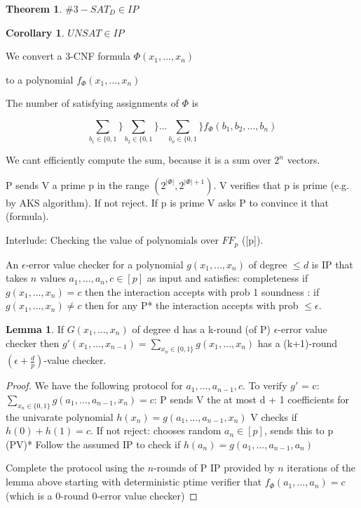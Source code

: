 \documentclass[a4paper,12pt]{article}
\theoremstyle{definition}
\newtheorem{lemma}[counter]{Lemma}
\newtheorem{theorem}[counter]{Theorem}
\newtheorem{corollary}[counter]{Corollary}
\theoremstyle{remark}
\begin{document}
\begin{theorem}
    $\#3-SAT_D \in IP$
\end{theorem}

\begin{corollary}
    $UNSAT \in IP$
\end{corollary}

We convert a 3-CNF formula $\Phi (x_1, \dots, x_n)$


to a polynomial $f_{\Phi} (x_1, \dots, x_n)$

The number of satisfying assignments of $\Phi$ is

\begin{equation*}
    \sum_{b_1 \in \{0, 1}\} \sum_{b_2 \in \{0, 1}\} \dots \sum_{b_n \in \{0, 1}\} f_{\Phi} (b_1, b_2, \dots, b_n)
\end{equation*}

We cant efficiently compute the sum, because it is a sum over $2^n$ vectors.

P sends V a prime p in the range $(2^{|\Phi|}, 2^{|\Phi|+1})$.
V verifies that p is prime (e.g. by AKS algorithm). If not reject.
If p is prime V asks P to convince it that (formula).

Interlude: Checking the value of polynomials over $FF_p$ ([p]).

An $\epsilon$-error value checker for a polynomial $g(x_1, \dots, x_n)$ of degree $\leq d$ is IP that takes $n$ values $a_1, \dots, a_n, c \in [p]$
as input and satisfies:
completeness if $g(x_1, \dots, x_n) = c$ then the interaction accepts with prob 1
soundness : if $g(x_1, \dots, x_n) \neq c$ then for any P* the interaction accepts with prob $\leq \epsilon$.

\begin{lemma}
    If $G(x_1, \dots, x_n)$ of degree d has a k-round (of P) $\epsilon$-error value checker then
    $g'(x_1, \dots, x_{n-1}) = \sum_{x_n \in \{0, 1\}} g(x_1, \dots, x_n)$ has a (k+1)-round
    $(\epsilon + \frac{d}{p})$-value checker.
\end{lemma}

\begin{proof}
    We have the following protocol for $a_1, \dots, a_{n-1}, c$. To verify $g'$ = c: $\sum_{x_n \in \{0, 1\}} g(a_1, \dots, a_{n-1}, x_n) = c$:
    P sends V the at most d + 1 coefficients for the univarate polynomial $h(x_n) = g(a_1, \dots, a_{n-1}, x_n)$
    V checks if $h(0) + h(1) = c$. If not reject:
    chooses random $a_n \in [p]$, sends this to p
    (PV)* Follow the assumed IP to check if $h(a_n) = g(a_1, \dots, a_{n-1}, a_n)$

    Complete the protocol using the $n$-rounds of P IP provided by $n$ iterations of the lemma above starting with deterministic ptime verifier that
    $f_{\Phi} (a_1, \dots, a_n) = c$ (which is a 0-round 0-error value checker)
\end{proof}
\end{document}
